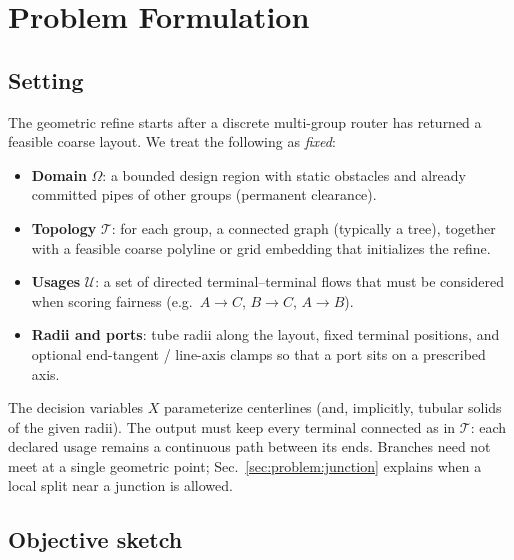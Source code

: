 
\section{Problem Formulation}
\label{sec:problem}

\subsection{Setting}
\label{sec:problem:setting}

The geometric refine starts after a discrete multi-group router has returned a
feasible coarse layout.
We treat the following as \emph{fixed}:

\begin{itemize}
  \item \textbf{Domain} $\Omega$: a bounded design region with static obstacles
        and already committed pipes of other groups (permanent clearance).
  \item \textbf{Topology} $\mathcal{T}$: for each group, a connected graph
        (typically a tree), together with a feasible coarse polyline or grid
        embedding that initializes the refine.
  \item \textbf{Usages} $\mathcal{U}$: a set of directed terminal--terminal
        flows that must be considered when scoring fairness
        (e.g.\ $A\!\to\!C$, $B\!\to\!C$, $A\!\to\!B$).
  \item \textbf{Radii and ports}: tube radii along the layout, fixed terminal
        positions, and optional end-tangent / line-axis clamps so that a port
        sits on a prescribed axis.
\end{itemize}

The decision variables $X$ parameterize centerlines (and, implicitly,
tubular solids of the given radii).
The output must keep every terminal connected as in $\mathcal{T}$: each declared
usage remains a continuous path between its ends.
Branches need not meet at a single geometric point; Sec.~\ref{sec:problem:junction}
explains when a local split near a junction is allowed.

\subsection{Objective sketch}
\label{sec:problem:objective}

